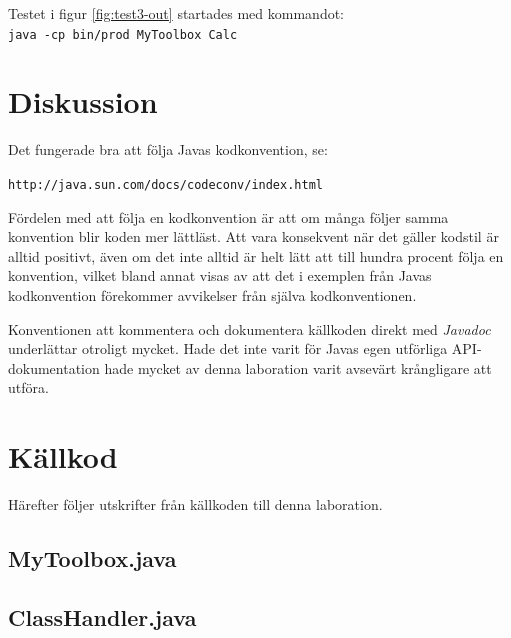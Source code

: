 \documentclass[a4paper, 12pt]{article}
\begin{document}
Testet i figur \ref{fig:test3-out} startades med kommandot:\\
\verb!java -cp bin/prod MyToolbox Calc!

\section{Diskussion}

Det fungerade bra att följa Javas kodkonvention, se:

\verb!http://java.sun.com/docs/codeconv/index.html!

Fördelen med att följa en kodkonvention är att om många följer samma
konvention blir koden mer lättläst. Att vara konsekvent när det gäller
kodstil är alltid positivt, även om det inte alltid är helt lätt att
till hundra procent följa en konvention, vilket bland annat visas av
att det i exemplen från Javas kodkonvention förekommer avvikelser från
själva kodkonventionen.

Konventionen att kommentera och dokumentera källkoden direkt med
\textit{Javadoc} underlättar otroligt mycket. Hade det inte varit för
Javas egen utförliga API-dokumentation hade mycket av denna laboration
varit  avsevärt krång\-ligare att utföra.

\newpage
\appendix
{}
\section{Källkod}
Härefter följer utskrifter från källkoden till denna laboration.

\subsection{MyToolbox.java}\label{mytoolbox.java}
\begin{footnotesize}

\end{footnotesize}
\newpage

\subsection{ClassHandler.java}\label{classhandler.java}
\begin{footnotesize}

\end{footnotesize}
\newpage
\end{document}
